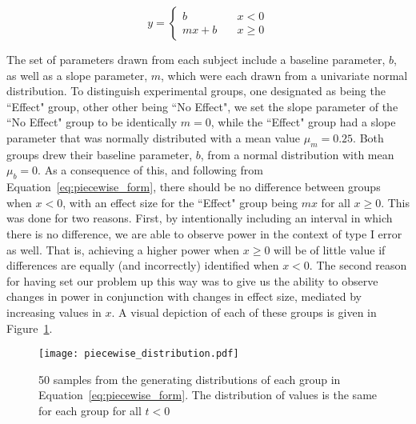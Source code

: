 \begin{equation}\label{eq:piecewise_form}
y = \begin{cases}
b \quad &x < 0 \\
mx + b \quad &x \geq 0
\end{cases}
\end{equation}

The set of parameters drawn from each subject include a baseline parameter, $b$, as well as a slope parameter, $m$, which were each drawn from a univariate normal distribution. To distinguish experimental groups, one designated as being the ``Effect" group, other other being ``No Effect", we set the slope parameter of the ``No Effect" group to be identically $m = 0$, while the ``Effect" group had a slope parameter that was normally distributed with a mean value $\mu_m = 0.25$. Both groups drew their baseline parameter, $b$, from a normal distribution with mean $\mu_b = 0$. As a consequence of this, and following from Equation~\ref{eq:piecewise_form}, there should be no difference between groups when $x < 0$, with an effect size for the ``Effect" group being $mx$ for all $x \geq 0$. This was done for two reasons. First, by intentionally including an interval in which there is no difference, we are able to observe power in the context of type I error as well. That is, achieving a higher power when $x \geq 0$ will be of little value if differences are equally (and incorrectly) identified when $x < 0$. The second reason for having set our problem up this way was to give us the ability to observe changes in power in conjunction with changes in effect size, mediated by increasing values in $x$. A visual depiction of each of these groups is given in Figure~\ref{fig:distribution_piece}. 


\begin{figure}[H]
    \centering
    \texttt{[image: piecewise\_distribution.pdf]}
    \caption{ 50 samples from the generating distributions of each group in Equation~\ref{eq:piecewise_form}. The distribution of values is the same for each group for all $t < 0$}
\label{fig:distribution_piece}
\end{figure}




